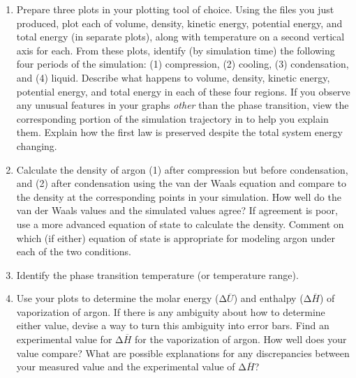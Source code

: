 \documentclass{article}
\begin{document}
\begin{enumerate}
  \item Prepare three plots in your plotting tool of choice.
    Using the  files you just produced, plot each of volume, density, kinetic energy, potential energy, and total energy (in separate plots), along with temperature on a second vertical axis for each.
    From these plots, identify (by simulation time) the following four periods of the simulation: (1) compression, (2) cooling, (3) condensation, and (4) liquid.
    Describe what happens to volume, density, kinetic energy, potential energy, and total energy in each of these four regions.
    If you observe any unusual features in your graphs \emph{other} than the phase transition, view the corresponding portion of the simulation trajectory in  to help you explain them.
    Explain how the first law is preserved despite the total system energy changing.
  \item Calculate the density of argon (1) after compression but before condensation, and (2) after condensation using the van der Waals equation and compare to the density at the corresponding points in your simulation.
    How well do the van der Waals values and the simulated values agree?
    If agreement is poor, use a more advanced equation of state to calculate the density.
    Comment on which (if either) equation of state is appropriate for modeling argon under each of the two conditions.
  \item Identify the phase transition temperature (or temperature range).
  \item Use your plots to determine the molar energy ($\increment \overbar{U}$) and enthalpy ($\increment \overbar{H}$) of vaporization of argon.
    If there is any ambiguity about how to determine either value, devise a way to turn this ambiguity into error bars. 
    Find an experimental value for $\increment \overbar{H}$ for the vaporization of argon.
    How well does your value compare?
    What are possible explanations for any discrepancies between your measured value and the experimental value of $\increment \overbar{H}$?
\end{enumerate}
\end{document}
